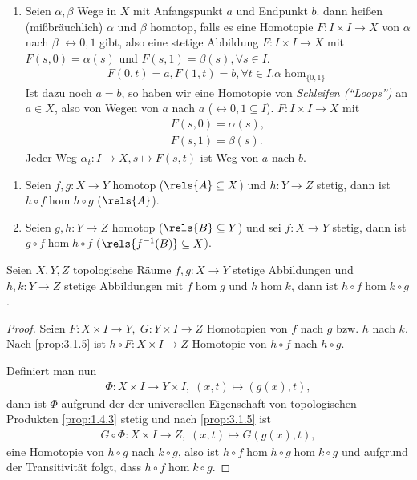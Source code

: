\begin{prop}[Spezialfälle]
\begin{enumerate}
\item Seien $\alpha,\beta$ Wege in $X$ mit Anfangspunkt $a$ und Endpunkt $b$. dann
heißen (mißbräuchlich) $\alpha$ und $\beta$ homotop, falls es eine Homotopie
$F:I\times I\to X$ von $\alpha$ nach $\beta$ $\rel{0,1}$ gibt, also eine
stetige Abbildung $F:I\times I\to X$ mit $F(s,0) = \alpha(s)$
und $F(s,1) = \beta(s), \forall s\in I$.
\begin{align*}
F(0,t) = a, F(1,t) = b, \forall t\in I. \alpha\hom_{\{0,1\}}
\end{align*}
Ist dazu noch $a=b$, so haben wir eine Homotopie von \emph{Schleifen
(``Loops'')} an $a\in X$, also von Wegen von $a$ nach $a$
($\rel{0,1}\subseteq I$). $F:I\times I \to X$ mit
\begin{align*}
F(s,0) = \alpha(s),\\
F(s,1) = \beta(s).
\end{align*}
Jeder Weg $\alpha_t : I\to X, s\mapsto F(s,t)$ ist Weg von $a$ nach $b$.
\end{enumerate}
\end{prop}

\begin{prop}[Probleme]
\label{prop:3.1.5}
\begin{enumerate}
  \item Seien $f,g: X\to Y$ homotop ($\rels{A}\subseteq X$) und $h: Y\to Z$
  stetig, dann ist $h\circ f\hom h\circ g$ ($\rels{A}$).
  \item Seien $g,h: Y\to Z$ homotop ($\rels{B}\subseteq Y$) und sei $f: X\to
  Y$ stetig, dann ist $g\circ f \hom h\circ f$ ($\rels{f^{-1}(B)}\subseteq
  X$).\fishhere
\end{enumerate}
\end{prop}

\begin{prop}
\label{prop:3.1.6}
Seien $X,Y,Z$ topologische Räume $f,g: X\to Y$ stetige Abbildungen und $h,k:
Y\to Z$ stetige Abbildungen mit $f\hom g$ und $h\hom k$, dann ist $h\circ f\hom
k\circ g$.\fishhere
\end{prop}
\begin{proof}
Seien $F: X\times I\to Y,\;G: Y\times I\to Z$ Homotopien von $f$ nach $g$ bzw.
$h$ nach $k$. Nach \ref{prop:3.1.5} ist $h\circ F: X\times I \to Z$ Homotopie
von $h\circ f$ nach $h\circ g$.

Definiert man nun
\begin{align*}
\Phi: X\times I \to Y\times I,\;(x,t)\mapsto (g(x),t),
\end{align*}
dann ist $\Phi$ aufgrund der der universellen Eigenschaft von topologischen
Produkten \ref{prop:1.4.3} stetig und nach \ref{prop:3.1.5} ist 
\begin{align*}
G\circ\Phi:X\times I \to Z,\;(x,t)\mapsto G(g(x),t),
\end{align*}
eine Homotopie von $h\circ g$ nach $k\circ g$, also ist
$h\circ f \hom h\circ g\hom k\circ g$ und aufgrund der Transitivität folgt,
dass $h\circ f\hom k\circ g$.\qedhere
\end{proof}

